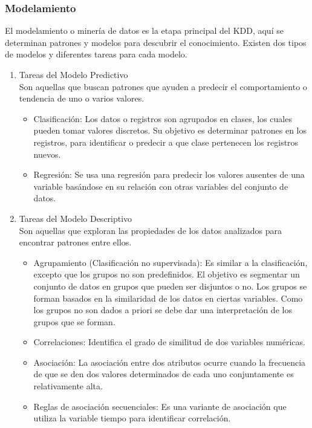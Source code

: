 \subsubsection{Modelamiento}

El modelamiento o minería de datos es la etapa principal del KDD, aquí se determinan patrones y modelos para descubrir el conocimiento. Existen dos tipos de modelos y diferentes tareas para cada modelo.

\begin{enumerate}
    \item Tareas del Modelo Predictivo\\
    Son aquellas que buscan patrones que ayuden a predecir el comportamiento o tendencia de uno o varios valores.\\
    
    \begin{itemize}
        \item Clasificación:
        Los datos o registros son agrupados en clases, los cuales pueden tomar valores discretos. Su objetivo es determinar patrones en los registros, para identificar o predecir a que clase pertenecen los registros nuevos.
        
        \item Regresión:
        Se usa una regresión para predecir los valores ausentes de una variable basándose en su relación con otras variables del conjunto de datos.
    \end{itemize}
    
    \item Tareas del Modelo Descriptivo\\
    Son aquellas que exploran las propiedades de los datos analizados para encontrar patrones entre ellos.\\
    
    \begin{itemize}
	\item Agrupamiento (Clasificación no supervisada):
	Es similar a la clasificación, excepto que los grupos no son predefinidos. El objetivo es segmentar un conjunto de datos en grupos que pueden ser disjuntos o no. Los grupos se forman basados en la similaridad de los datos en ciertas variables. Como los grupos no son dados a priori se debe dar una interpretación de los grupos que se forman.
	
	\item Correlaciones:
	Identifica el grado de similitud de dos variables numéricas.
	\item Asociación:
	La asociación entre dos atributos ocurre cuando la frecuencia de que se den dos valores determinados de cada uno conjuntamente es relativamente alta.
	\item Reglas de asociación secuenciales:
	Es una variante de asociación que utiliza la variable tiempo para identificar correlación.
	
	
\end{itemize}

\end{enumerate}


